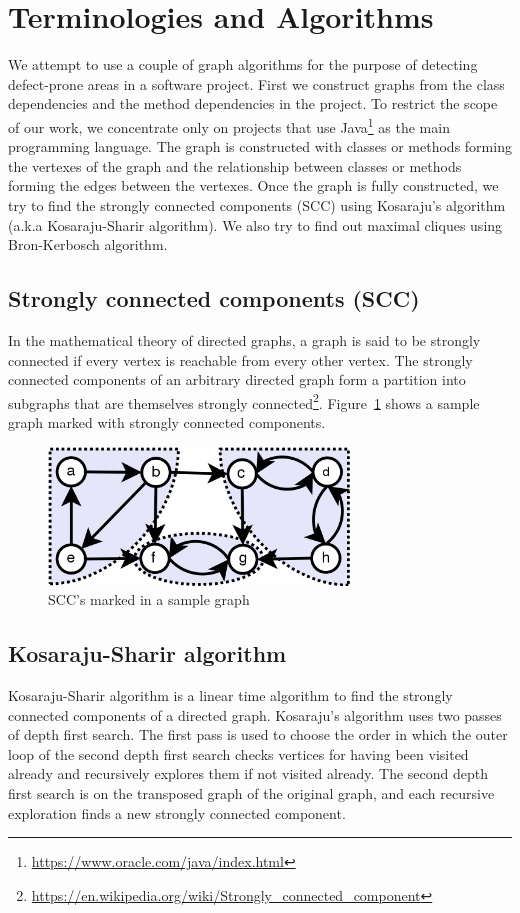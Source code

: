 \section{Terminologies and Algorithms}
\label{sec:algos}

We attempt to use a couple of graph algorithms for the purpose of detecting defect-prone areas in a software project. First we construct graphs from the class dependencies and the method dependencies in the project. To restrict the scope of our work, we concentrate only on projects that use Java\footnote{\url{https://www.oracle.com/java/index.html}} as the main programming language. The graph is constructed with classes or methods forming the vertexes of the graph and the relationship between classes or methods forming the edges between the vertexes. Once the graph is fully constructed, we try to find the strongly connected components (SCC) using Kosaraju's algorithm (a.k.a Kosaraju-Sharir algorithm). We also try to find out maximal cliques using Bron-Kerbosch algorithm. 

\subsection{Strongly connected components (SCC)}
In the mathematical theory of directed graphs, a graph is said to be strongly connected if every vertex is reachable from every other vertex. The strongly connected components of an arbitrary directed graph form a partition into subgraphs that are themselves strongly connected\footnote{\url{https://en.wikipedia.org/wiki/Strongly_connected_component}}. Figure~\ref{fig:scc_sample} shows a sample graph marked with strongly connected components.

\begin{figure}[h!]
\includegraphics[width=8cm]{scc_sample}
\caption{SCC's marked in a sample graph}
\label{fig:scc_sample}
\end{figure}

\subsection{Kosaraju-Sharir algorithm}
Kosaraju-Sharir algorithm\cite{sharir1981strong} is a linear time algorithm to find the strongly connected components of a directed graph. Kosaraju's algorithm uses two passes of depth first search. The first pass is used to choose the order in which the outer loop of the second depth first search checks vertices for having been visited already and recursively explores them if not visited already. The second depth first search is on the transposed graph of the original graph, and each recursive exploration finds a new strongly connected component\cite{cormen2001introduction}.

